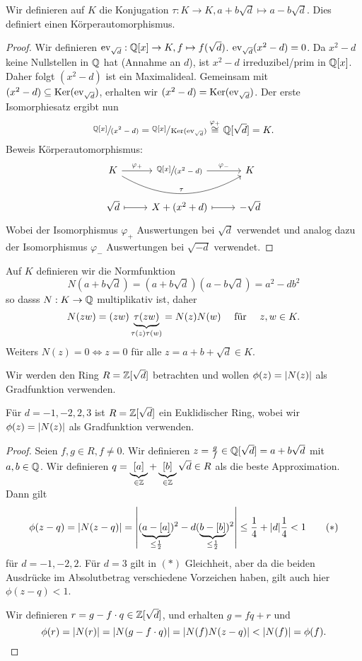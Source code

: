 Wir definieren auf $K$ die Konjugation $\tau: K \to K, a+ b\sqrt{d} \mapsto a- b \sqrt{d}$.
Dies definiert einen Körperautomorphismus.

\begin{proof}
	Wir definieren $\operatorname{ev}_{\sqrt{d}}: \mathbb{Q}[x] \to K, f \mapsto f(\sqrt{d})$.
	$\operatorname{ev}_{\sqrt{d}}(x^2-d) = 0$.
	Da $x^2-d$ keine Nullstellen in $\mathbb{Q}$ hat (Annahme an $d$), ist $x^2-d$ irreduzibel/prim in $\mathbb{Q}[x]$.
	Daher folgt $(x^2-d)$ ist ein Maximalideal.
	Gemeinsam mit $(x^2-d) \subseteq \operatorname{Ker}(\operatorname{ev}_{\sqrt{d}})$, erhalten wir $(x^2-d) = \operatorname{Ker}(\operatorname{ev}_{\sqrt{d}})$.
	Der erste Isomorphiesatz ergibt nun
	\[
		\sfrac{\mathbb{Q}[x]}{(x^2-d)} = \sfrac{\mathbb{Q}[x]}{\operatorname{Ker}(\operatorname{ev}_{\sqrt{d}})} \stackrel{\varphi_{+}}{\cong} \mathbb{Q}[\sqrt{d}] = K
	.\]
	Beweis Körperautomorphismus:
	\[
		\begin{tikzcd}
			K \arrow[r, "\varphi_{+}"] \arrow[rr, "\tau", bend right] & {\sfrac{\Q[x]}{(x^2-d)}} \arrow[r, "\varphi_{-}"] & K         \\
			\sqrt{d} \arrow[r, maps to]                                & X+(x^2+d) \arrow[r, maps to]                       & -\sqrt{d}
		\end{tikzcd}
	\]
	Wobei der Isomorphismus $\varphi_{+}$ Auswertungen bei $\sqrt{d}$ verwendet und analog
	dazu der Isomorphismus $\varphi_{-}$ Auswertungen bei $\sqrt{-d}$ verwendet.
\end{proof}


Auf $K$ definieren wir die Normfunktion
\[
	N(a+b \sqrt{d} ) = (a+b \sqrt{d} )(a-b \sqrt{d}) = a^2 - d b^2 
\]
so dasss $N : K \to \mathbb{Q}$ multiplikativ ist, daher 
\[
	N(zw) = (zw) \underbrace{\tau(zw)}_{\tau(z) \tau(w)} = N(z) N(w) \qq{ für } z,w \in K
.\] 
Weiters $N(z) = 0 \Leftrightarrow z = 0$ für alle $z = a + b + \sqrt{d} \in K $.

Wir werden den Ring $R = \mathbb{Z}[\sqrt{d}]$ betrachten und wollen $\phi(z) = \abs{N(z)}$ als Gradfunktion verwenden.

\begin{theorem}
	Für $d = -1, -2, 2, 3$ ist  $R = \mathbb{Z}[\sqrt{d}]$ ein Euklidischer Ring, wobei wir $\phi(z) = \abs{N(z)}$ als Gradfunktion verwenden.
\end{theorem}

\begin{proof}
	Seien $f,g \in R, f \neq 0$. Wir definieren $z = \frac{g}{f} \in \mathbb{Q}[\sqrt{d}] = a+b \sqrt{d}$ mit $a,b \in \mathbb{Q}$.
	Wir definieren $q = \underbrace{[a]}_{\in \mathbb{Z}} + \underbrace{[b]}_{\in \mathbb{Z}} \sqrt{d} \in R$ als die beste Approximation.
	Dann gilt 
	\begin{align*}
		\phi(z-q) = \abs{N(z-q)} = \abs{(\underbrace{a-[a]}_{\leq \frac{1}{2}})^2 - d (\underbrace{b-[b]}_{\leq \frac{1}{2}})^2 } \leq \frac{1}{4} + \abs{d} \frac{1}{4} < 1 \tag{$*$}
	\end{align*}
	für $d = -1,-2,2$.
	Für $d = 3$ gilt in $(*)$ Gleichheit, aber da die beiden Ausdrücke im Absolutbetrag verschiedene Vorzeichen haben,
	gilt auch hier $\phi(z-q) < 1$.

	Wir definieren $r = g - f \cdot q \in \mathbb{Z}[\sqrt{d}]$, und erhalten $g = fq + r$ und 
	\[
		\phi(r) = \abs{N(r)} = \abs{N(g-f\cdot q) } = \abs{N(f) N(z-q)} < \abs{N(f)} = \phi(f)
	.\] 
\end{proof}

